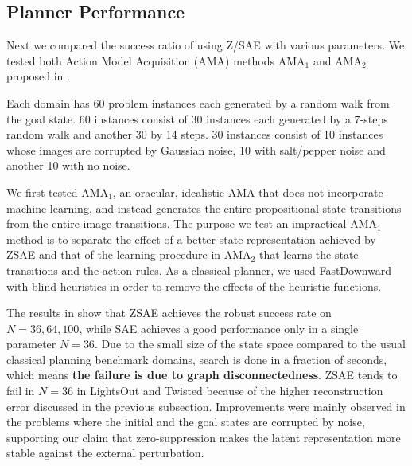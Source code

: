 \subsection{Planner Performance}

Next we compared the success ratio of \latentplanner using Z/SAE with various parameters.
We tested both Action Model Acquisition (AMA) methods AMA$_1$ and AMA$_2$ proposed in \cite{Asai2018}.

Each domain has 60 problem instances each generated by a random walk from
the goal state. 60 instances consist of 30 instances each generated by a 7-steps random walk
and another 30 by 14 steps. 30 instances consist of 10 instances whose images are corrupted by Gaussian noise,
10 with salt/pepper noise and another 10 with no noise.

We first tested AMA$_1$, an oracular, idealistic AMA that does not incorporate machine learning,
and instead generates the entire propositional state transitions from the entire image transitions.
The purpose we test an impractical AMA$_1$ method is
to separate the effect of a better state representation achieved by ZSAE
and that of the learning procedure in AMA$_2$ that learns the state transitions and the action rules.
As a classical planner, we used FastDownward \cite{Helmert04} with blind heuristics in order to
remove the effects of the heuristic functions.

The results in  show that ZSAE achieves the robust success rate on $N=36,64,100$,
while SAE achieves a good performance only in a single parameter $N=36$.
% 
Due to the small size of the state space compared to the usual classical planning benchmark domains,
search is done in a fraction of seconds, which means \textbf{the failure is due to graph disconnectedness}.
ZSAE tends to fail in $N=36$ in LightsOut and Twisted because of the higher reconstruction error
discussed in the previous subsection.
% 
Improvements were mainly observed in the problems where
the initial and the goal states are corrupted by noise, supporting our claim that
zero-suppression makes the latent representation more stable against the external perturbation.

